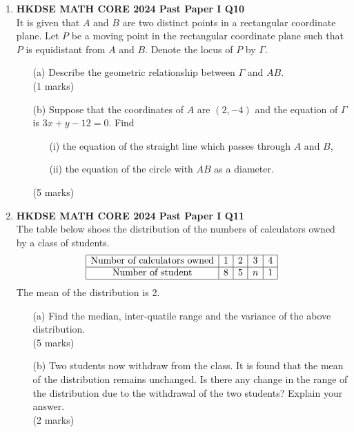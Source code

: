 \documentclass[12pt]{article}
\begin{document}
\begin{enumerate}
	\item \textbf{HKDSE MATH CORE 2024 Past Paper I Q10}\\
	It is given that $A$ and $B$ are two distinct points in a rectangular coordinate plane. Let $P$ be a moving point in the rectangular coordinate plane such that $P$ is equidistant from $A$ and $B$. Denote the locus of $P$ by $\Gamma$.
	\begin{enumerate}
		\item[(a)] Describe the geometric relationship between $\Gamma$ and $AB$. \\(1 marks)
		\item[(b)] Suppose that the coordinates of $A$ are $(2, -4)$ and the equation of $\Gamma$ is $3x + y - 12 = 0$. Find 
		\begin{enumerate}
			\item[(i)] the equation of the straight line which passes through $A$ and $B$,
			\item[(ii)] the equation of the circle with $AB$ as a diameter.
		\end{enumerate}
		(5 marks)
	\end{enumerate}

	\item \textbf{HKDSE MATH CORE 2024 Past Paper I Q11}\\
	The table below shoes the distribution of the numbers of calculators owned by a class of students.
	$$\begin{array}{|c|c|c|c|c|}
		\hline
		\text{Number of calculators owned} & 1 & 2 & 3 & 4 \\
		\hline
		\text{Number of student} & 8 & 5 & n & 1 \\
		\hline
	\end{array}$$
	The mean of the distribution is 2.
	\begin{enumerate}
		\item[(a)] Find the median, inter-quatile range and the variance of the above distribution. \\(5 marks)
		\item[(b)] Two students now withdraw from the class. It is found that the mean of the distribution remains unchanged. Is there any change in the range of the distribution due to the withdrawal of the two students? Explain your answer. \\(2 marks)
	\end{enumerate}


\end{enumerate}
\end{document}
